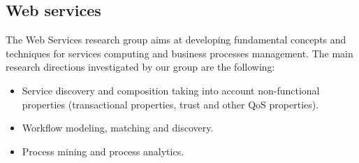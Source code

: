 %
%
%


\subsection{Web services}

The Web Services research group aims at developing fundamental concepts and techniques for services computing and business processes management.
The main research directions investigated by our group are the following:
\begin{itemize}
\item Service discovery and composition taking into account non-functional properties (transactional properties, trust and other QoS properties).
\item    Workflow modeling, matching and discovery.
\item    Process mining and process analytics.
\end{itemize}


